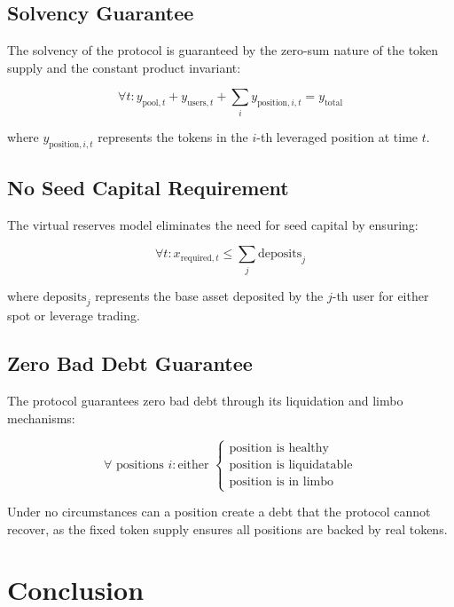 \documentclass[11pt]{article}
\begin{document}
\subsection{Solvency Guarantee}

The solvency of the protocol is guaranteed by the zero-sum nature of the token supply and the constant product invariant:

\begin{equation}
\forall t: y_{\text{pool},t} + y_{\text{users},t} + \sum_{i} y_{\text{position},i,t} = y_{\text{total}}
\end{equation}

where $y_{\text{position},i,t}$ represents the tokens in the $i$-th leveraged position at time $t$.

\subsection{No Seed Capital Requirement}

The virtual reserves model eliminates the need for seed capital by ensuring:

\begin{equation}
\forall t: x_{\text{required},t} \leq \sum_{j} \text{deposits}_j
\end{equation}

where $\text{deposits}_j$ represents the base asset deposited by the $j$-th user for either spot or leverage trading.

\subsection{Zero Bad Debt Guarantee}

The protocol guarantees zero bad debt through its liquidation and limbo mechanisms:

\begin{equation}
\forall \text{ positions } i: \text{either } \begin{cases}
\text{position is healthy} \\
\text{position is liquidatable} \\
\text{position is in limbo}
\end{cases}
\end{equation}

Under no circumstances can a position create a debt that the protocol cannot recover, as the fixed token supply ensures all positions are backed by real tokens.

\section{Conclusion}
\end{document}
